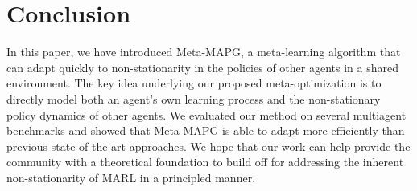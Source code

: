 \section{Conclusion}\label{sec:conclusion}
In this paper, we have introduced Meta-MAPG, a meta-learning algorithm that can adapt quickly to non-stationarity in the policies of other agents in a shared environment. The key idea underlying our proposed meta-optimization is to directly model both an agent's own learning process and the non-stationary policy dynamics of other agents.
We evaluated our method on several multiagent benchmarks and showed that Meta-MAPG is able to adapt more efficiently than previous state of the art approaches. 
We hope that our work can help provide the community with a theoretical foundation to build off for addressing the inherent non-stationarity of MARL in a principled manner. 